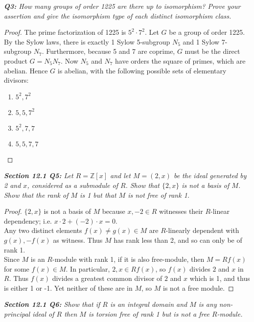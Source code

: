 \documentclass{article}
\begin{document}
\it \textbf{Q3:} How many groups of order 1225 are there up to isomorphism?
  Prove your assertion and give the isomorphism type of each distinct
  isomorphism class.

  \begin{proof}
    The prime factorization of 1225 is $5^2\cdot7^2$. Let $G$ be a group of
    order 1225. By the Sylow laws, there is exactly 1 Sylow 5-subgroup
    $N_5$ and 1 Sylow 7-subgroup $N_7$. Furthermore, because 5 and 7 are
    coprime, $G$ must be the direct product $G=N_5N_7$. Now $N_5$ and $N_7$
    have orders the square of primes, which are abelian. Hence $G$ is
    abelian, with the following possible sets of elementary divisors:
    \begin{enumerate}[label={(\alph*)}]
      \item $5^2,7^2$
      \item $5,5,7^2$
      \item $5^2,7,7$
      \item $5,5,7,7$
    \end{enumerate}
  \end{proof}

\it \textbf{Section 12.1 Q5:} Let $R=\mathbb{Z}[x]$ and let $M=(2,x)$ be
  the ideal generated by 2 and $x$, considered as a submodule of $R$. Show
  that $\{2,x\}$ is not a basis of $M$. Show that the rank of $M$ is 1 but
  that $M$ is not free of rank 1.

  \begin{proof}
    $\{2,x\}$ is not a basis of $M$ because $x,-2\in R$ witnesses their
    $R$-linear dependency; i.e. $x\cdot2+(-2)\cdot x=0$. \\

    Any two distinct elements $f(x)\neq g(x)\in M$ are $R$-linearly
    dependent with $g(x),-f(x)$ as witness. Thus $M$ has rank less than 2,
    and so can only be of rank 1. \\

    Since $M$ is an $R$-module with rank 1, if it is also free-module, then
    $M=Rf(x)$ for some $f(x)\in M$. In particular, $2,x\in Rf(x)$, so
    $f(x)$ divides $2$ and $x$ in $R$. Thus $f(x)$ divides a greatest
    common divisor of $2$ and $x$ which is 1, and thus is either 1 or -1.
    Yet neither of these are in $M$, so $M$ is not a free module.
  \end{proof}

\it \textbf{Section 12.1 Q6:} Show that if $R$ is an integral domain and
  $M$ is any non-principal ideal of $R$ then $M$ is torsion free of rank 1
  but is not a free $R$-module.
\end{document}
